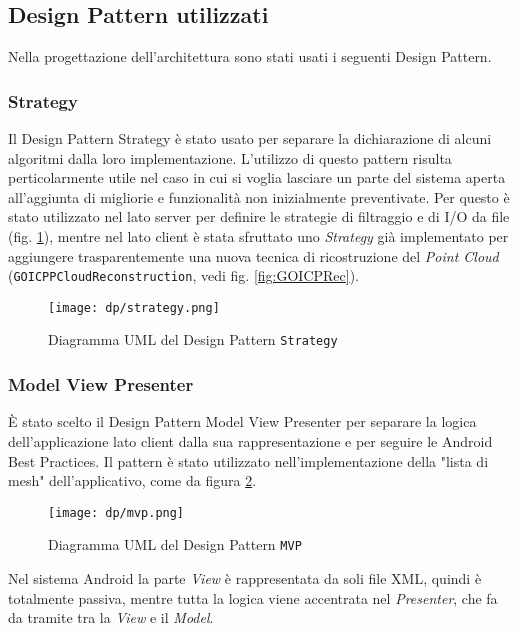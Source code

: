 \subsection{Design Pattern utilizzati}
Nella progettazione dell'architettura sono stati usati i seguenti Design Pattern.

\subsubsection{Strategy}
Il Design Pattern Strategy è stato usato per separare la dichiarazione di alcuni algoritmi
dalla loro implementazione. L'utilizzo di questo pattern risulta perticolarmente utile nel caso in cui si voglia lasciare un parte del sistema aperta all'aggiunta di migliorie e funzionalità non inizialmente preventivate. Per questo è stato utilizzato nel lato server per definire le strategie di filtraggio e di I/O da file (fig. \ref{fig:strategy}), mentre nel lato client è stata sfruttato uno \emph{Strategy} già implementato per aggiungere trasparentemente una nuova tecnica di ricostruzione del \emph{Point Cloud} (\texttt{GOICPPCloudReconstruction}, vedi fig. \ref{fig:GOICPRec}).
\begin{figure}[!h] 
    \centering 
    \texttt{[image: dp/strategy.png]} 
    \caption{Diagramma UML del Design Pattern \texttt{Strategy}}
   \label{fig:strategy}
\end{figure}

\subsubsection{Model View Presenter}
È stato scelto il Design Pattern Model View Presenter per separare la logica dell’applicazione lato client dalla sua rappresentazione e per seguire le Android Best Practices. Il pattern è stato utilizzato nell'implementazione della "lista di mesh" dell'applicativo, come da figura \ref{fig:mvp}.
\begin{figure}[!h] 
    \centering 
    \texttt{[image: dp/mvp.png]} 
    \caption{Diagramma UML del Design Pattern \texttt{MVP}}
   \label{fig:mvp}
\end{figure}
\newline
Nel sistema Android la parte \emph{View} è rappresentata da soli file XML, quindi è totalmente passiva, mentre tutta la logica viene accentrata nel \emph{Presenter}, che fa da tramite tra la  \emph{View} e il \emph{Model}.

